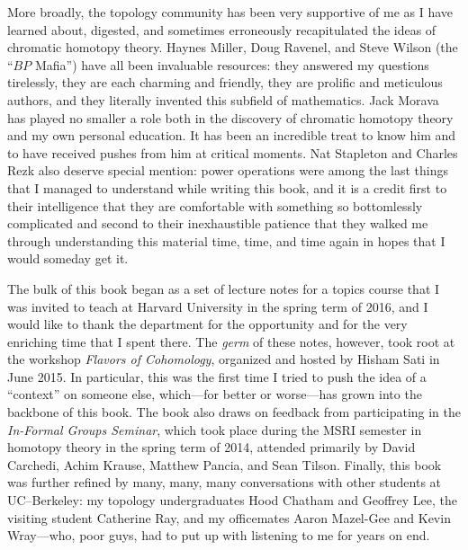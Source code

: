 More broadly, the topology community has been very supportive of me as I have learned about, digested, and sometimes erroneously recapitulated the ideas of chromatic homotopy theory.  Haynes Miller, Doug Ravenel, and Steve Wilson (the ``$BP$ Mafia'') have all been invaluable resources: they answered my questions tirelessly, they are each charming and friendly, they are prolific and meticulous authors, and they literally invented this subfield of mathematics.  Jack Morava has played no smaller a role both in the discovery of chromatic homotopy theory and my own personal education.  It has been an incredible treat to know him and to have received pushes from him at critical moments.  Nat Stapleton and Charles Rezk also deserve special mention: power operations were among the last things that I managed to understand while writing this book, and it is a credit first to their intelligence that they are comfortable with something so bottomlessly complicated and second to their inexhaustible patience that they walked me through understanding this material time, time, and time again in hopes that I would someday get it.

The bulk of this book began as a set of lecture notes for a topics course that I was invited to teach at Harvard University in the spring term of 2016, and I would like to thank the department for the opportunity and for the very enriching time that I spent there.  The \emph{germ} of these notes, however, took root at the workshop \textit{Flavors of Cohomology}, organized and hosted by Hisham Sati in June 2015.  In particular, this was the first time I tried to push the idea of a ``context'' on someone else, which---for better or worse---has grown into the backbone of this book.  The book also draws on feedback from participating in the \textit{In-Formal Groups Seminar}, which took place during the MSRI semester in homotopy theory in the spring term of 2014, attended primarily by David Carchedi, Achim Krause, Matthew Pancia, and Sean Tilson.  Finally, this book was further refined by many, many, many conversations with other students at UC--Berkeley: my topology undergraduates Hood Chatham and Geoffrey Lee, the visiting student Catherine Ray, and my officemates Aaron Mazel-Gee and Kevin Wray---who, poor guys, had to put up with listening to me for years on end.

